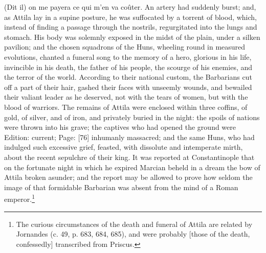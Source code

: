 {(Dit il) on me payera ce qui m\texthebrew{}’en va coûter.} An artery had suddenly burst; and, as Attila lay in a supine posture, he was suffocated by a torrent of blood, which, instead of finding a passage through the nostrils, regurgitated into the lungs and stomach. His body was solemnly exposed in the midst of the plain, under a silken pavilion; and the chosen squadrons of the Huns, wheeling round in measured evolutions, chanted a funeral song to the memory of a hero, glorious in his life, invincible in his death, the father of his people, the scourge of his enemies, and the terror of the world. According to their national custom, the Barbarians cut off a part of their hair, gashed their faces with unseemly wounds, and bewailed their valiant leader as he deserved, not with the tears of women, but with the blood of warriors. The remains of Attila were enclosed within three coffins, of gold, of silver, and of iron, and privately buried in the night: the spoils of nations were thrown into his grave; the captives who had opened the ground were Edition: current; Page: [76] inhumanly massacred; and the same Huns, who had indulged such excessive grief, feasted, with dissolute and intemperate mirth, about the recent sepulchre of their king. It was reported at Constantinople that on the fortunate night in which he expired Marcian beheld in a dream the bow of Attila broken asunder; and the report may be allowed to prove how seldom the image of that formidable Barbarian was absent from the mind of a Roman emperor.\footnote{The curious circumstances of the death and funeral of Attila are related by Jornandes (c. 49, p. 683, 684, 685), and were probably [those of the death, confessedly] transcribed from Priscus.}

